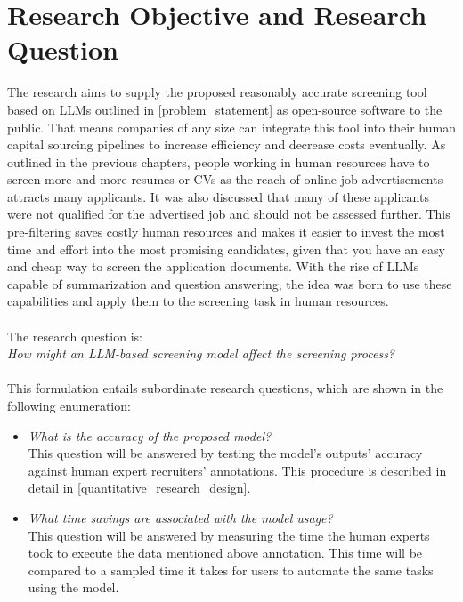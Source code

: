 \documentclass[draft,final]{thesisclass} %
\begin{document}
\section{Research Objective and Research Question} \label{research_objective_and_research_question}
The research aims to supply the proposed reasonably accurate screening tool based on \acs{LLM}s outlined in \ref{problem_statement} as open-source software to the public. 
That means companies of any size can integrate this tool into their human capital sourcing pipelines to increase efficiency and decrease costs eventually.
As outlined in the previous chapters, people working in human resources have to screen more and more resumes or \acs{CV}s as the reach of online job advertisements attracts many applicants.
It was also discussed that many of these applicants were not qualified for the advertised job and should not be assessed further.
This pre-filtering saves costly human resources and makes it easier to invest the most time and effort into the most promising candidates, given that you have an easy and cheap way to screen the application documents.
With the rise of \acs{LLM}s capable of summarization and question answering, the idea was born to use these capabilities and apply them to the screening task in human resources.
\\\\
The research question is:\\
\textit{How might an \acs{LLM}-based screening model affect the screening process?}\\\\
This formulation entails subordinate research questions, which are shown in the following enumeration:
\begin{itemize}
    \item \textit{What is the accuracy of the proposed model?}\\
    This question will be answered by testing the model's outputs' accuracy against human expert recruiters' annotations.
    This procedure is described in detail in \ref{quantitative_research_design}.
    \item \textit{What time savings are associated with the model usage?}\\
    This question will be answered by measuring the time the human experts took to execute the data mentioned above annotation.
    This time will be compared to a sampled time it takes for users to automate the same tasks using the model.
\end{itemize}
\end{document}
